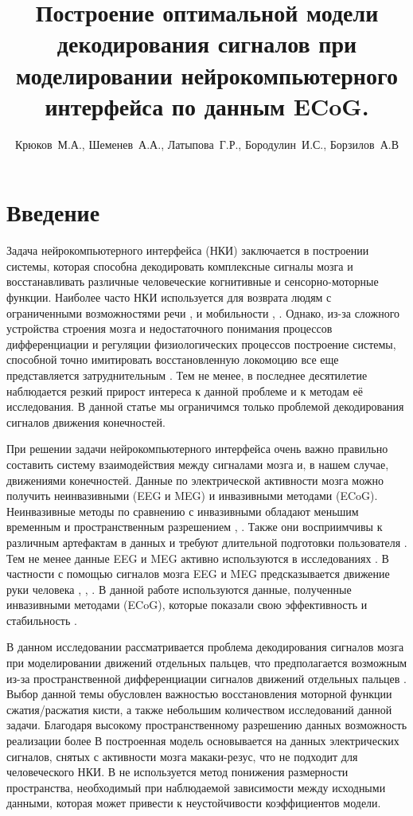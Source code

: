 \documentclass[12pt,twoside]{article}
\title
    [Прогнозирование движений по данным ECoG] %
    {Построение оптимальной модели декодирования сигналов при моделировании нейрокомпьютерного интерфейса по данным ECoG.}
\author
    [Крюков~М.А., Шеменев~А.А., Латыпова~Г.Р., Бородулин~И.С., Борзилов~А.В] %
    {Крюков~М.А., Шеменев~А.А., Латыпова~Г.Р., Бородулин~И.С., Борзилов~А.В} %
    [Крюков~М.А.$^1$, Шеменев~А.А.$^1$, Латыпова~Г.Р.$^1$, Бородулин~И.С.$^1$, Борзилов~А.В$^1$] %
\begin{document}
\maketitle

\section{Введение}
		Задача нейрокомпьютерного интерфейса (НКИ) заключается в построении системы, которая способна декодировать комплексные сигналы мозга и восстанавливать различные человеческие когнитивные и сенсорно-моторные функции. Наиболее часто НКИ используется для возврата людям с ограниченными возможностями речи \cite{Wolpaw2000}, \cite{Kennedy2000} и мобильности \cite{Kennedy2000}, \cite{Hochberg2012} \cite{Pfurtscheller2000}.  Однако, из-за сложного устройства строения мозга и недостаточного понимания процессов дифференциации и регуляции физиологических процессов построение системы, способной точно имитировать восстановленную локомоцию все еще представляется затруднительным \cite{Nicolas2012}. Тем не менее, в последнее десятилетие наблюдается резкий прирост интереса к данной проблеме \cite{Nicolas2012} и к методам её исследования. В данной статье мы ограничимся только проблемой декодирования сигналов движения конечностей.
		
		При решении задачи нейрокомпьютерного интерфейса очень важно правильно составить систему взаимодействия между сигналами мозга и, в нашем случае, движениями конечностей. Данные по электрической активности мозга можно получить неинвазивными (EEG и MEG) и инвазивными методами (ECoG). Неинвазивные методы по сравнению с инвазивными обладают меньшим временным и пространственным разрешением \cite{Nicolas2012}, \cite{Srinivasan1998}. Также они восприимчивы к различным артефактам в данных и требуют длительной подготовки пользователя \cite{Leuthardt2004}. Тем не менее данные EEG и MEG активно используются в исследованиях \cite{Waldert2008}. В частности с помощью сигналов мозга EEG и MEG предсказывается движение руки человека \cite{Waldert2008}, \cite{Pfurtscheller2003}, \cite{MullerPuts2005}. В данной работе используются данные, полученные инвазивными методами (ECoG), которые показали свою эффективность и стабильность \cite{Leuthardt2004}.
				
		В данном исследовании рассматривается проблема декодирования сигналов мозга при моделировании движений отдельных пальцев, что предполагается возможным из-за пространственной дифференциации сигналов движений отдельных пальцев \cite{Miller2014}. Выбор данной темы обусловлен важностью восстановления моторной функции сжатия/расжатия кисти, а также небольшим количеством исследований данной задачи. Благодаря высокому пространственному разрешению данных возможность реализации более В \cite{Irwin} построенная модель основывается на данных электрических сигналов, снятых с активности мозга макаки-резус, что не подходит для человеческого НКИ. В \cite{oai:hal.inria.fr:hal-00762316} не используется метод понижения размерности пространства, необходимый при наблюдаемой зависимости между исходными данными, которая может привести к неустойчивости коэффициентов модели.
		
\end{document}
